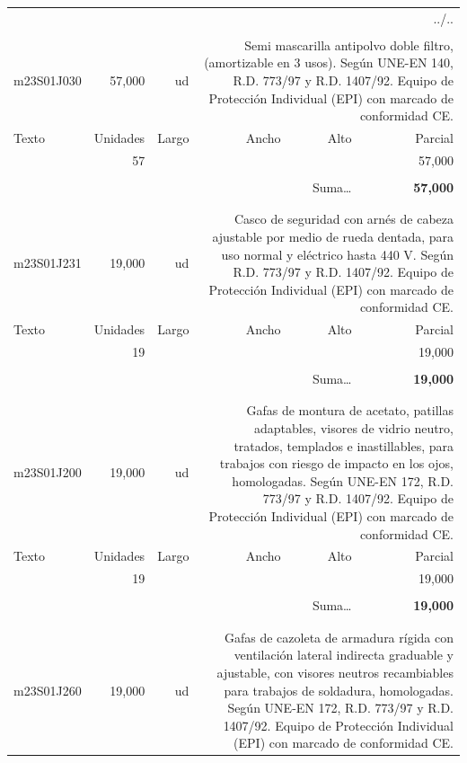 \documentclass{book}%
\begin{document}
\begin{longtable}{lrrrrr}%
\multicolumn{6}{r}{../..}\\%
\endfoot%
\endlastfoot%
&&&&&\\%
m23S01J030&    57,000& ud&\multicolumn{3}{p{6cm}}{\scriptsize Semi mascarilla antipolvo doble filtro, (amortizable en 3 usos). Según UNE-EN 140, R.D. 773/97 y R.D. 1407/92. Equipo de Protección Individual (EPI) con marcado de conformidad CE.\normalsize}\\%
Texto&Unidades&Largo&Ancho&Alto&Parcial\\%
\hline%
\multicolumn{1}{p{3.5cm}}{ }&57&&&&    57,000\\%
&&&&&\\%
\multicolumn{5}{r}{Suma\ldots}&\textbf{    57,000}\\%
\hline%
&&&&&\\%
&&&&&\\%
m23S01J231&    19,000& ud&\multicolumn{3}{p{6cm}}{\scriptsize Casco de seguridad con arnés de cabeza ajustable por medio de rueda dentada, para uso normal y eléctrico hasta 440 V. Según R.D. 773/97 y R.D. 1407/92. Equipo de Protección Individual (EPI) con marcado de conformidad CE.\normalsize}\\%
Texto&Unidades&Largo&Ancho&Alto&Parcial\\%
\hline%
\multicolumn{1}{p{3.5cm}}{ }&19&&&&    19,000\\%
&&&&&\\%
\multicolumn{5}{r}{Suma\ldots}&\textbf{    19,000}\\%
\hline%
&&&&&\\%
&&&&&\\%
m23S01J200&    19,000& ud&\multicolumn{3}{p{6cm}}{\scriptsize Gafas de montura de acetato, patillas adaptables, visores de vidrio neutro, tratados, templados e inastillables, para trabajos con riesgo de impacto en los ojos, homologadas. Según UNE-EN 172, R.D. 773/97 y R.D. 1407/92. Equipo de Protección Individual (EPI) con marcado de conformidad CE.\normalsize}\\%
Texto&Unidades&Largo&Ancho&Alto&Parcial\\%
\hline%
\multicolumn{1}{p{3.5cm}}{ }&19&&&&    19,000\\%
&&&&&\\%
\multicolumn{5}{r}{Suma\ldots}&\textbf{    19,000}\\%
\hline%
&&&&&\\%
&&&&&\\%
m23S01J260&    19,000& ud&\multicolumn{3}{p{6cm}}{\scriptsize Gafas de cazoleta de armadura rígida con ventilación lateral indirecta graduable y ajustable, con visores neutros recambiables para trabajos de soldadura, homologadas. Según UNE-EN 172, R.D. 773/97 y R.D. 1407/92. Equipo de Protección Individual (EPI) con marcado de conformidad CE.\normalsize}\\%

\end{longtable}
\end{document}
